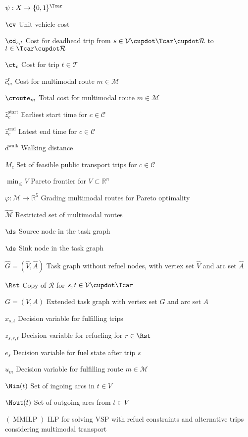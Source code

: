 \begin{labeling}{$\psi:X\to\{0,1\}^{\Tcar}$}
	\item[$\cv$]{Unit vehicle cost}
	\item[$\cd_{s,t}$]{Cost for deadhead trip from $s\in\mathcal{V}\cupdot\Tcar\cupdot\mathcal{R}$ to $t\in\Tcar\cupdot\mathcal{R}$}
	\item[$\ct_t$]{Cost for trip $t\in\mathcal{T}$}
	\item[$\bar{c}^{\operatorname{r}}_m$]{Cost for multimodal route $m\in\mathcal{M}$}
	\item[$\croute_m$]{Total cost for multimodal route $m\in\mathcal{M}$}
	\item[$\hat{z}^{\operatorname{start}}_c$]{Earliest start time for $c\in\mathcal{C}$}
	\item[$\hat{z}^{\operatorname{end}}_c$]{Latest end time for $c\in\mathcal{C}$}
	\item[$d^{\operatorname{walk}}$]{Walking distance}
	\item[$M_c$]{Set of feasible public transport trips for $c\in\mathcal{C}$}
	\item[$\operatorname{min}_{\leq}V$]{Pareto frontier for $V\subset\mathbb{R}^n$}
	\item[$\varphi:\mathcal{M}\to\mathbb{R}^5$]{Grading multimodal routes for Pareto optimality}
	\item[$\hat{\mathcal{M}}$]{Restricted set of multimodal routes}
	\item[$\ds$]{Source node in the task graph}
	\item[$\de$]{Sink node in the task graph}
	\item[$\hat{G}=\left(\hat{V},\hat{A}\right)$]{Task graph without refuel nodes, with vertex set $\hat{V}$ and arc set $\hat{A}$}
	\item[$\Rst$]{Copy of $\mathcal{R}$ for $s,t\in\mathcal{V}\cupdot\Tcar$}
	\item[$G=(V,A)$]{Extended task graph with vertex set $G$ and arc set $A$}
	\item[$x_{s,t}$]{Decision variable for fulfilling trips}
	\item[$z_{s,r,t}$]{Decision variable for refueling for $r\in\Rst$}
	\item[$e_s$]{Decision variable for fuel state after trip $s$}
	\item[$u_m$]{Decision variable for fulfilling route $m\in\mathcal{M}$}
	\item[$\Nin(t)$]{Set of ingoing arcs in $t\in V$}
	\item[$\Nout(t)$]{Set of outgoing arcs from $t\in V$}
	\item[$(\operatorname{MMILP})$]{ILP for solving VSP with refuel constraints and alternative trips considering multimodal transport}

\end{labeling}

